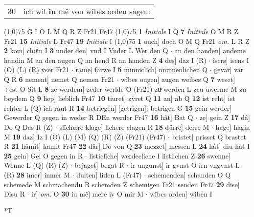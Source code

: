 \documentclass[8pt,a4paper,notitlepage]{article}
\begin{document}
\begin{table}[ht]
\begin{minipage}[t]{0.5\linewidth}
\begin{tabular}{rl}
30 & ich wil \textbf{iu} mê von wîbes orden sagen:\\ 
\end{tabular}
\scriptsize
\line(1,0){75} \newline
G I O L M Q R Z Fr21 Fr47 \newline
\line(1,0){75} \newline
\textbf{1} \textit{Initiale} I Q  \textbf{7} \textit{Initiale} O M R Z Fr21  \textbf{15} \textit{Initiale} L Fr47  \textbf{19} \textit{Initiale} I  \newline
\line(1,0){75} \newline
\textbf{1} ouch] doch O M Q Fr21 \textit{om.} L R Z \textbf{2} kom] choͤm I \textbf{3} under den] vnd I Vnder L Wer den Q  $\cdot$ an den handen] andeme handin M an den augen Q an hend R an handen Z \textbf{4} des] daz I (R)  $\cdot$ îsers] isens I (O) (L) (R) ẏser Fr21  $\cdot$ râme] farwe I \textbf{5} minniclîch] munnenlichen Q  $\cdot$ gevar] var Q R \textbf{6} nement] nemet Q nemen Fr21  $\cdot$ wîbes ougen] augen weibes Q \textbf{7} weset] ÷est O Sit L \textbf{8} ze werdem] zeder werlde O (Fr21) zuͯ werden L zcu uwerme M zu beydem Q \textbf{9} liep] lieblich Fr47 \textbf{10} tiuret] zÿret Q \textbf{11} an] ab Q \textbf{12} ist reht] ist rehter L (Q) ich raut R \textbf{14} betriegen] [getrigen]: betrigen G \textbf{15} gein werder] Gewerder Q gegen in weder R DEn werder Fr47 \textbf{16} hât] Bat Q  $\cdot$ ze] gein Z \textbf{17} dâ] Do Q Das R (Z)  $\cdot$ slîchære klage] lichere clagen R \textbf{18} dürre] derre M  $\cdot$ hage] hagin M \textbf{19} daz] Iz I (O) (L) (M) (Q) (R) (Z) (Fr21) (Fr47)  $\cdot$ bristet] prisset Q brastet R \textbf{21} hâmît] kamit Fr47 \textbf{22} dâr] Do von Q \textbf{23} mezzet] messen L \textbf{24} hât] diu hat I \textbf{25} gein] Gei O gegen in R  $\cdot$ listiclîche] werdecliche I listlichen Z \textbf{26} swenne] Wenne L (Q) (R) (Z)  $\cdot$ bejaget] begat R  $\cdot$ ir ungunst] ir gvnst O irn vngvnst L (R) \textbf{28} imer] inmer M  $\cdot$ dulten] liden L (Fr47)  $\cdot$ schemenden] schanden O Q schemede M schmachendu R schemden Z schemigen Fr21 senden Fr47 \textbf{29} dise] Disu R  $\cdot$ ir] \textit{om.} O \textbf{30} iu mê] mere iv O mir M  $\cdot$ wîbes orden] wiben I \newline
\end{minipage}
\hspace{0.5cm}
\begin{minipage}[t]{0.5\linewidth}
\small
\begin{center}*T
\end{center}

\end{minipage}
\end{table}
\end{document}
